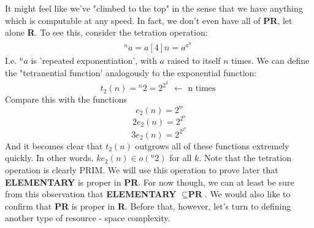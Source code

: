 It might feel like we've "climbed to the top" in the sense that we have anything which is computable at any speed. In fact, we don't even have all of \textbf{PR}, let alone \textbf{R}. To see this, consider the tetration operation:
\begin{align}
    ^na = a[4]n = a^{a^{a^{.^{.^{.^{a}}}}}}
\end{align}
I.e. $^na$ is 'repeated exponentiation', with $a$ raised to itself $n$ times. We can define the "tetranential function' analogously to the exponential function:
   \[ t_2(n) = {}^n2 = 2^{2^{2^{.^{.^{.^{2}}}}}} \leftarrow \textrm{ n times }\]
Compare this with the functions
   \[ e_2(n) = 2^n \]
   \[ 2e_2(n) = 2^{2^n} \]
   \[ 3e_2(n) = 2^{2^{2^n}} \]
And it becomes clear that $t_2(n)$ outgrows all of these functions extremely quickly. In other words, $ke_2(n) \in o({}^n2)$ for all $k$. Note that the tetration operation is clearly PRIM. We will use this operation to prove later that \textbf{ELEMENTARY} is proper in \textbf{PR}. For now though, we can at least be sure from this observation that \textbf{ELEMENTARY} $\subseteq \textbf{PR}$. We would also like to confirm that \textbf{PR} is proper in \textbf{R}. Before that, however, let's turn to defining another type of resource - space complexity.

